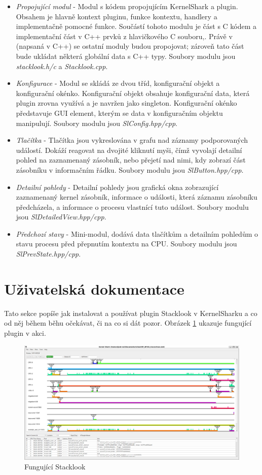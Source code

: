 \begin{itemize}
    \item \emph{Propojující modul} - Modul s kódem propojujícím KernelShark a plugin. Obsahem je hlavně kontext pluginu, funkce kontextu, handlery a implementačně pomocné funkce. Součástí tohoto modulu je část s C kódem a implementační část v C++ prvků z hlavičkového C souboru,. Právě v  (napsaná v C++) se ostatní moduly budou propojovat; zároveň tato část bude ukládat některá globální data s C++ typy. Soubory modulu jsou \emph{stacklook.h/c} a \emph{Stacklook.cpp}.
    \item \emph{Konfigurace} - Modul se skládá ze dvou tříd, konfigurační objekt a konfigurační okénko. Konfigurační objekt obsahuje konfigurační data, která plugin zrovna využívá a je navržen jako singleton. Konfigurační okénko představuje GUI element, kterým se data v konfiguračním objektu manipulují. Soubory modulu jsou \emph{SlConfig.hpp/cpp}.
    \item \emph{Tlačítka} - Tlačítka jsou vykreslována v grafu nad záznamy podporovaných událostí. Dokáží reagovat na dvojité kliknutí myši, čímž vyvolají detailní pohled na zaznamenaný zásobník, nebo přejetí nad nimi, kdy zobrazí část zásobníku v informačním řádku. Soubory modulu jsou \emph{SlButton.hpp/cpp}.
    \item \emph{Detailní pohledy} - Detailní pohledy jsou grafická okna zobrazující zaznamenaný kernel zásobník, informace o události, která záznamu zásobníku předcházela, a informace o procesu vlastnící tuto událost. Soubory modulu jsou \emph{SlDetailedView.hpp/cpp}.
    \item \emph{Předchozí stavy} - Mini-modul, dodává data tlačítkům a detailním pohledům o stavu procesu před přepnutím kontextu na CPU. Soubory modulu jsou \emph{SlPrevState.hpp/cpp}.
\end{itemize}

\section{Uživatelská dokumentace}

Tato sekce popíše jak instalovat a používat plugin Stacklook v KernelSharku a co od něj během běhu očekávat, či na co si dát pozor. Obrázek \ref{SlWorking} ukazuje fungující plugin v akci.

\begin{figure}[p]\centering
    \includegraphics[width=140mm]{img/Stacklook/SlWorking}
    \caption{Fungující Stacklook}
    \label{SlWorking}
\end{figure}

